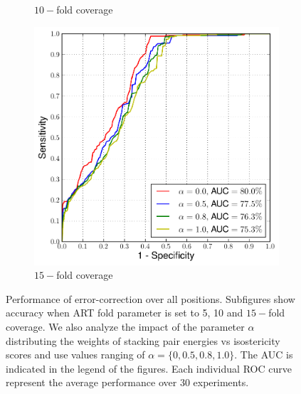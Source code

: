 \begin{figure}[t]
\begin{subfigure}{.33\textwidth}
    \caption{$10-$fold coverage}
\end{subfigure}
\begin{subfigure}{.33\textwidth}
  \centering
  \includegraphics[width=\linewidth]{Figure8-15fold-a}
    \caption{$15-$fold coverage}
\end{subfigure}
\caption{Performance of error-correction over all positions. Subfigures show accuracy when
ART fold parameter is set to 5, 10 and $15-$fold coverage. We also analyze the impact of the parameter $\alpha$ distributing the weights of stacking pair energies vs isostericity scores and use values ranging of $\alpha = \{0, 0.5, 0.8, 1.0\}$. The AUC is indicated in the legend of the figures. Each individual ROC curve represent the average performance over 30 experiments.}

\label{fig:16s_all}
\end{figure}

